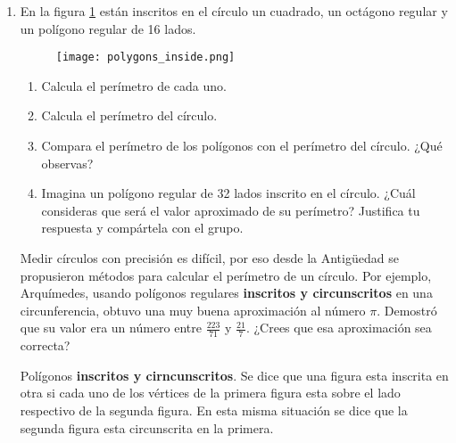 \begin{enumerate}
    \item En la figura \ref{fig:polygons_inside} están inscritos en el círculo un cuadrado,
          un octágono regular y un polígono regular de 16 lados.

          \begin{minipage}{0.3\textwidth}
              \begin{figure}[H]
                  \centering
                  \texttt{[image: polygons\_inside.png]}
                  \label{fig:polygons_inside}
              \end{figure}
          \end{minipage}\hfill
          \begin{minipage}{0.7\textwidth}
              \begin{enumerate}
                  \item Calcula el perímetro de cada uno.
                  \item Calcula el perímetro del círculo.
                  \item Compara el perímetro de los polígonos con el perímetro del círculo. ¿Qué observas?
                  \item Imagina un polígono regular de 32 lados inscrito en el círculo. ¿Cuál consideras
                        que será el valor aproximado de su perímetro? Justifica tu respuesta y compártela con el grupo.
              \end{enumerate}
          \end{minipage}

          \begin{boxH}
              Medir círculos con precisión es difícil, por eso desde la Antigüedad se propusieron
              métodos para calcular el perímetro de un círculo. Por ejemplo, Arquímedes, usando
              polígonos regulares \textbf{\color{cyan}inscritos y circunscritos} en una circunferencia, obtuvo una muy
              buena aproximación al número $\pi$. Demostró que su valor era un número entre $\frac{223}{71}$ y $\frac{21}{7}$.
              ¿Crees que esa aproximación sea correcta?
          \end{boxH}

          \begin{boxE}
              Polígonos \textbf{\color{cyan}inscritos y cirncunscritos}. Se dice que una figura esta inscrita en otra si cada
              uno de los vértices de la primera figura esta sobre el lado respectivo de la segunda figura.
              En esta misma situación se dice que la segunda figura esta circunscrita en la primera.
          \end{boxE}


\end{enumerate}
